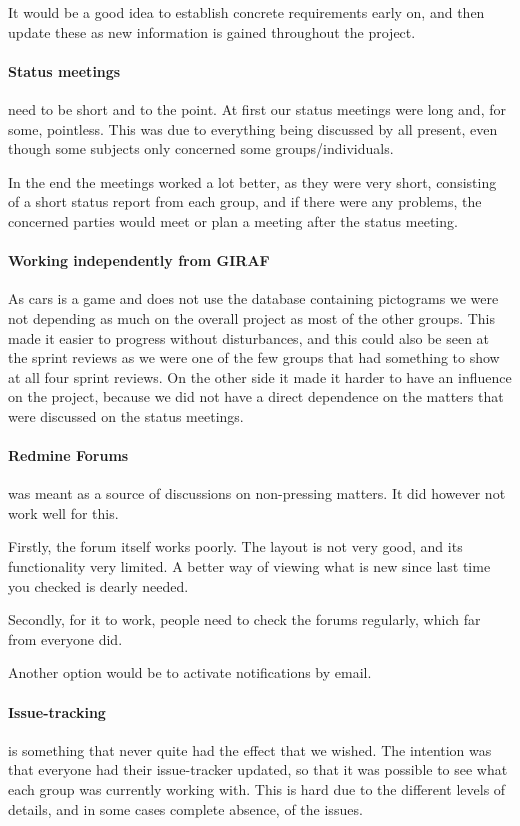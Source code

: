 It would be a good idea to establish concrete requirements early on, and then update these as new information is gained throughout the project.

\paragraph{Status meetings} need to be short and to the point.
At first our status meetings were long and, for some, pointless.
This was due to everything being discussed by all present, even though some subjects only concerned some groups/individuals.

In the end the meetings worked a lot better, as they were very short, consisting of a short status report from each group, and if there were any problems, the concerned parties would meet or plan a meeting after the status meeting.

\paragraph{Working independently from GIRAF}
As cars is a game and does not use the database containing pictograms we were not depending as much on the overall project as most of the other groups.
This made it easier to progress without disturbances, and this could also be seen at the sprint reviews as we were one of the few groups that had something to show at all four sprint reviews.
On the other side it made it harder to have an influence on the project, because we did not have a direct dependence on the matters that were discussed on the status meetings.

\paragraph{Redmine Forums} was meant as a source of discussions on non-pressing matters.
It did however not work well for this.

Firstly, the forum itself works poorly.
The layout is not very good, and its functionality very limited.
A better way of viewing what is new since last time you checked is dearly needed.

Secondly, for it to work, people need to check the forums regularly, which far from everyone did.

Another option would be to activate notifications by email.

\paragraph{Issue-tracking} is something that never quite had the effect that we wished.
The intention was that everyone had their issue-tracker updated, so that it was possible to see what each group was currently working with.
This is hard due to the different levels of details, and in some cases complete absence, of the issues.

